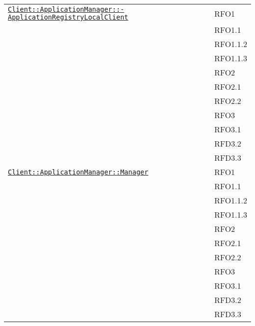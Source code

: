 \begin{longtable}{|>{\centering}m{10cm}|m{3cm}<{\centering}|}
\hyperref[Client::ApplicationManager::ApplicationRegistryLocalClient]{\texttt{Client::ApplicationManager::-\linebreak ApplicationRegistryLocalClient}} & RFO1\\
& RFO1.1\\
& RFO1.1.2\\
& RFO1.1.3\\
& RFO2\\
& RFO2.1\\
& RFO2.2\\
& RFO3\\
& RFO3.1\\
& RFD3.2\\
& RFD3.3\\ \hline

\hyperref[Client::ApplicationManager::Manager]{\texttt{Client::ApplicationManager::Manager}} & RFO1\\
& RFO1.1\\
& RFO1.1.2\\
& RFO1.1.3\\
& RFO2\\
& RFO2.1\\
& RFO2.2\\
& RFO3\\
& RFO3.1\\
& RFD3.2\\
& RFD3.3\\ \hline


\end{longtable}

